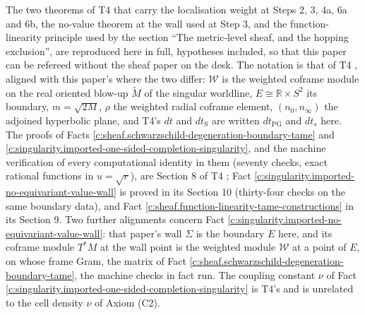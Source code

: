 \documentclass[11pt]{article}
\theoremstyle{definition}
\theoremstyle{plain}
\providecommand{\Mt}{}\renewcommand{\Mt}{\widetilde{M}}
\providecommand{\R}{}\renewcommand{\R}{\mathbb{R}}
\providecommand{\nInf}{}\renewcommand{\nInf}{n_\infty}
\providecommand{\nO}{}\renewcommand{\nO}{n_0}
\providecommand{\shW}{}\renewcommand{\shW}{\mathcal{W}}
\begin{document}
\label{c:note.singularity.setting-imported-localisation-theorems-verbatim}
The two theorems of T4 \cite{ButlerT4} that carry the localisation weight at Steps 2, 3, 4a, 6a and 6b, the no-value theorem at the wall used at Step 3, and the function-linearity principle used by the section ``The metric-level sheaf, and the hopping exclusion'', are reproduced here in full, hypotheses included, so that this paper can be refereed without the sheaf paper on the desk. The notation is that of T4 \cite{ButlerT4}, aligned with this paper's where the two differ: $\shW$ is the weighted coframe module on the real oriented blow-up $\Mt$ of the singular worldline, $E \cong \R \times S^2$ its boundary, $m = \sqrt{2M}$, $\rho$ the weighted radial coframe element, $(\nO, \nInf)$ the adjoined hyperbolic plane, and T4's $dt$ and $dt_{\mathrm{S}}$ are written $dt_{\mathrm{PG}}$ and $dt_s$ here. The proofs of Facts \ref{c:sheaf.schwarzschild-degeneration-boundary-tame} and \ref{c:singularity.imported-one-sided-completion-singularity}, and the machine verification of every computational identity in them (seventy checks, exact rational functions in $u = \sqrt r$), are Section 8 of T4 \cite{ButlerT4}; Fact \ref{c:singularity.imported-no-equivariant-value-wall} is proved in its Section 10 (thirty-four checks on the same boundary data), and Fact \ref{c:sheaf.function-linearity-tame-constructions} in its Section 9. Two further alignments concern Fact \ref{c:singularity.imported-no-equivariant-value-wall}: that paper's wall $\Sigma$ is the boundary $E$ here, and its coframe module $T^*M$ at the wall point is the weighted module $\shW$ at a point of $E$, on whose frame Gram, the matrix of Fact \ref{c:sheaf.schwarzschild-degeneration-boundary-tame}, the machine checks in fact run. The coupling constant $\nu$ of Fact \ref{c:singularity.imported-one-sided-completion-singularity} is T4's and is unrelated to the cell density $\nu$ of Axiom (C2).
\end{document}
